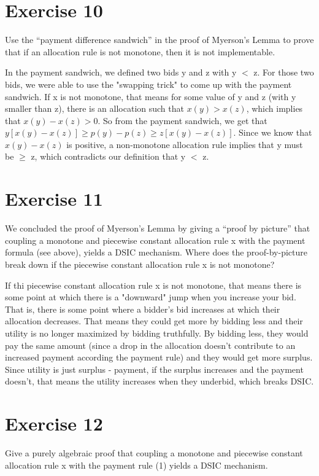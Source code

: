\documentclass{article}
\begin{document}
\section*{Exercise 10}
Use the “payment difference sandwich” in the proof of Myerson’s Lemma to prove that if an allocation rule is not monotone, then it is not implementable.

In the payment sandwich, we defined two bids y and z with y $<$ z.  For those
two bids, we were able to use the "swapping trick" to come up with the payment
sandwich.  If x is not monotone, that means for some value of y and z (with y
smaller than z), there is an allocation such that $x(y) > x(z)$,
which implies that $x(y) - x(z) > 0$.  So from the payment sandwich, we get
that $y[x(y) - x(z)] \geq p(y) - p(z) \geq z[x(y) - x(z)]$.  Since we know
that $x(y) - x(z)$ is positive, a non-monotone allocation rule implies that y
must be $\geq$ z, which contradicts our definition that y $<$ z.
\section*{Exercise 11}
We concluded the proof of Myerson’s Lemma by giving a “proof by picture” that coupling a monotone and
piecewise constant allocation rule x with the payment formula (see above), yields a DSIC
mechanism. Where does the proof-by-picture break down if the piecewise constant allocation rule x is not
monotone?

If thi piecewise constant allocation rule x is not monotone, that means there
is some point at which there is a "downward" jump when you increase your bid.
That is, there is some point where a bidder's bid increases at which their
allocation decreases.  That means they could get more by bidding less and
their utility is no longer maximized by bidding truthfully.  By bidding less,
they would pay the same amount (since a drop in the allocation doesn't
contribute to an increased payment according the payment rule) and they would
get more surplus.  Since utility is just surplus - payment, if the surplus
increases and the payment doesn't, that means the utility increases when they
underbid, which breaks DSIC.

\section*{Exercise 12}
Give a purely algebraic proof that coupling a monotone and piecewise constant allocation rule x with the
payment rule (1) yields a DSIC mechanism.
\end{document}
